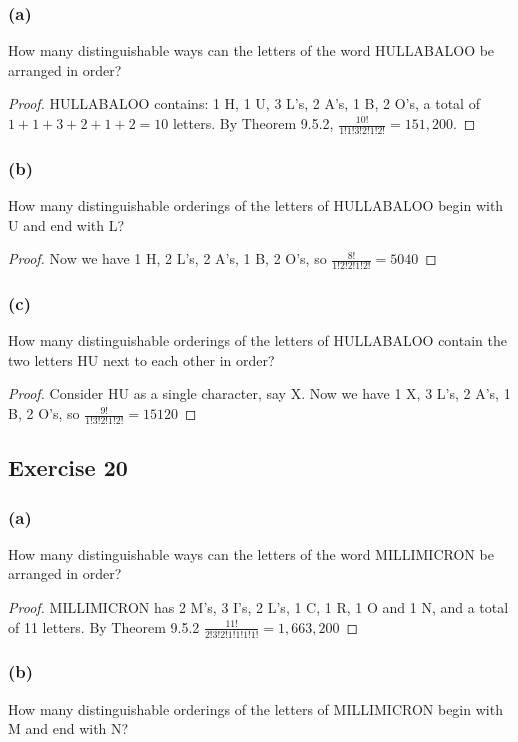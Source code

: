 \documentclass[14pt]{extarticle}
\newcommand{\dps}{\displaystyle}
\begin{document}
\subsubsection{(a)}
How many distinguishable ways can the letters of the word HULLABALOO be arranged in order?

\begin{proof}
HULLABALOO contains: 1 H, 1 U, 3 L's, 2 A's, 1 B, 2 O's, a total of \(1+1+3+2+1+2 = 10\) letters. By Theorem 9.5.2,
\(\dps\frac{10!}{1!1!3!2!1!2!} = 151,200\).
\end{proof}

\subsubsection{(b)}
How many distinguishable orderings of the letters of HULLABALOO begin with U and end with L?

\begin{proof}
Now we have 1 H, 2 L's, 2 A's, 1 B, 2 O's, so \(\dps\frac{8!}{1!2!2!1!2!} = 5040\)
\end{proof}

\subsubsection{(c)}
How many distinguishable orderings of the letters of HULLABALOO contain the two letters HU next to each other in 
order?

\begin{proof}
Consider HU as a single character, say X. Now we have 1 X, 3 L's, 2 A's, 1 B, 2 O's, so \(\frac{9!}{1!3!2!1!2!} = 15120\)
\end{proof}

\subsection{Exercise 20}
\subsubsection{(a)}
How many distinguishable ways can the letters of the word MILLIMICRON be arranged in order?

\begin{proof}
MILLIMICRON has 2 M's, 3 I's, 2 L's, 1 C, 1 R, 1 O and 1 N, and a total of 11 letters. By Theorem 9.5.2 
\(\frac{11!}{2!3!2!1!1!1!1!} = 1,663,200\)
\end{proof}

\subsubsection{(b)}
How many distinguishable orderings of the letters of MILLIMICRON begin with M and end with N?
\end{document}
